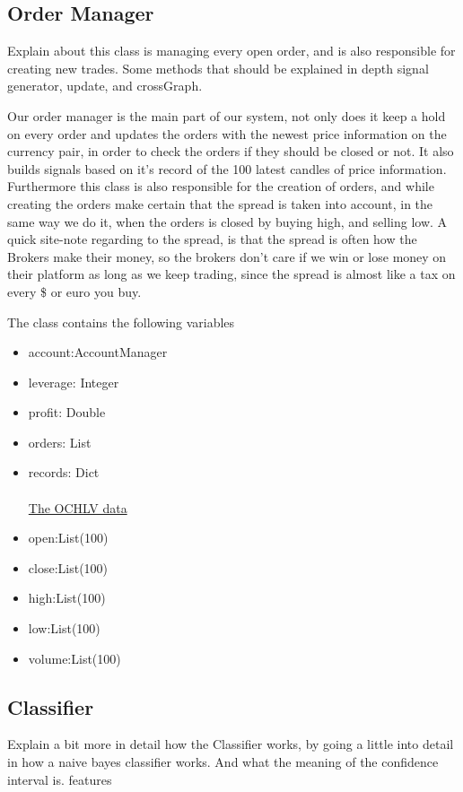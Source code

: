 \subsection{Order Manager}
Explain about this class is managing every open order, and is also responsible for creating new trades. Some methods that should be explained in depth signal generator, update, and crossGraph.

Our order manager is the main part of our system, not only does it keep a hold on every order and updates the orders with the newest price information on the currency pair, in order to check the orders if they should be closed or not. It also builds signals based on it's record of the 100 latest candles of price information. Furthermore this class is also responsible for the creation of orders, and while creating the orders make certain that the spread is taken into account, in the same way we do it, when the orders is closed by buying high, and selling low. A quick site-note regarding to the spread, is that the spread is often how the Brokers make their money, so the brokers don't care if we win or lose money on their platform as long as we keep trading, since the spread is almost like a tax on every \$ or euro you buy.

The class contains the following variables
\begin{itemize}
\item{account:AccountManager}
\item{leverage: Integer}
\item{profit: Double}
\item{orders: List}
\item{records: Dict}
\\
\\
\underline{The OCHLV data}
\item{open:List(100)}
\item{close:List(100)}
\item{high:List(100)}
\item{low:List(100)}
\item{volume:List(100)}
\end{itemize}


\subsection{Classifier}
Explain a bit more in detail how the Classifier works, by going a little into detail in how a naive bayes classifier works. And what the meaning of the confidence interval is.
features
